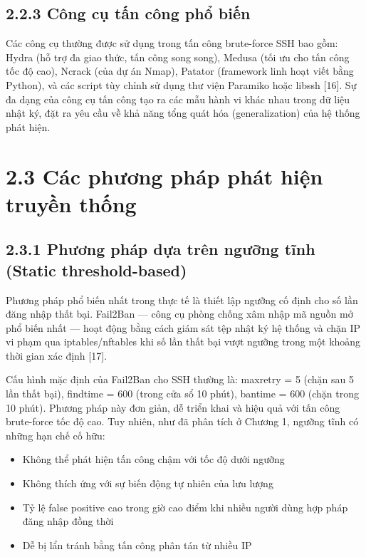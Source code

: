 \documentclass[
  a4paper]{report}
\providecommand{\tightlist}{%
  \setlength{\itemsep}{0pt}\setlength{\parskip}{0pt}}
\begin{document}
\subsection{2.2.3 Công cụ tấn công phổ
biến}\label{cuxf4ng-cux1ee5-tux1ea5n-cuxf4ng-phux1ed5-biux1ebfn}

Các công cụ thường được sử dụng trong tấn công brute-force SSH bao gồm:
Hydra (hỗ trợ đa giao thức, tấn công song song), Medusa (tối ưu cho tấn
công tốc độ cao), Ncrack (của dự án Nmap), Patator (framework linh hoạt
viết bằng Python), và các script tùy chỉnh sử dụng thư viện Paramiko
hoặc libssh {[}16{]}. Sự đa dạng của công cụ tấn công tạo ra các mẫu
hành vi khác nhau trong dữ liệu nhật ký, đặt ra yêu cầu về khả năng tổng
quát hóa (generalization) của hệ thống phát hiện.

\section{2.3 Các phương pháp phát hiện truyền
thống}\label{cuxe1c-phux1b0ux1a1ng-phuxe1p-phuxe1t-hiux1ec7n-truyux1ec1n-thux1ed1ng}

\subsection{2.3.1 Phương pháp dựa trên ngưỡng tĩnh (Static
threshold-based)}\label{phux1b0ux1a1ng-phuxe1p-dux1ef1a-truxean-ngux1b0ux1ee1ng-tux129nh-static-threshold-based}

Phương pháp phổ biến nhất trong thực tế là thiết lập ngưỡng cố định cho
số lần đăng nhập thất bại. Fail2Ban --- công cụ phòng chống xâm nhập mã
nguồn mở phổ biến nhất --- hoạt động bằng cách giám sát tệp nhật ký hệ
thống và chặn IP vi phạm qua iptables/nftables khi số lần thất bại vượt
ngưỡng trong một khoảng thời gian xác định {[}17{]}.

Cấu hình mặc định của Fail2Ban cho SSH thường là: maxretry = 5 (chặn sau
5 lần thất bại), findtime = 600 (trong cửa sổ 10 phút), bantime = 600
(chặn trong 10 phút). Phương pháp này đơn giản, dễ triển khai và hiệu
quả với tấn công brute-force tốc độ cao. Tuy nhiên, như đã phân tích ở
Chương 1, ngưỡng tĩnh có những hạn chế cố hữu:

\begin{itemize}
\tightlist
\item
  Không thể phát hiện tấn công chậm với tốc độ dưới ngưỡng
\item
  Không thích ứng với sự biến động tự nhiên của lưu lượng
\item
  Tỷ lệ false positive cao trong giờ cao điểm khi nhiều người dùng hợp
  pháp đăng nhập đồng thời
\item
  Dễ bị lẩn tránh bằng tấn công phân tán từ nhiều IP
\end{itemize}
\end{document}
